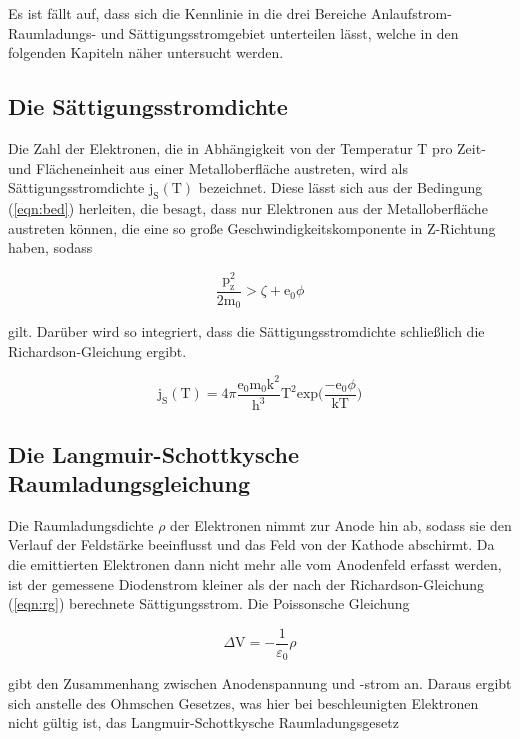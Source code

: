 \noindent
Es ist fällt auf, dass sich die Kennlinie in die drei Bereiche Anlaufstrom- Raumladungs- und Sättigungsstromgebiet unterteilen lässt,
welche in den folgenden Kapiteln näher untersucht werden.


\subsection{Die Sättigungsstromdichte}

\noindent
Die Zahl der Elektronen, die in Abhängigkeit von der Temperatur T pro Zeit- und Flächeneinheit aus einer Metalloberfläche austreten, 
wird als Sättigungsstromdichte $\text{j}_\text{S}(\text{T})$ bezeichnet.
Diese lässt sich aus der Bedingung (\ref{eqn:bed}) herleiten, die besagt, dass nur Elektronen aus der Metalloberfläche austreten können, 
die eine so große Geschwindigkeitskomponente in Z-Richtung haben, sodass

\begin{equation}
\frac{\text{p}_\text{z}^2}{2\text{m}_0} > \zeta + \text{e}_0 \phi
\label{eqn:bed}
\end{equation}

\noindent
gilt. Darüber wird so integriert, dass die Sättigungsstromdichte schließlich die Richardson-Gleichung ergibt.

\begin{equation}
\text{j}_\text{S}(\text{T}) = 4\pi \frac{\text{e}_0 \text{m}_0 \text{k}^2}{\text{h}^3} \text{T}^2 \text{exp} \biggl( \frac{-\text{e}_0 \phi}{\text{kT}} \biggr)
\label{eqn:rg}
\end{equation}

\subsection{Die Langmuir-Schottkysche Raumladungsgleichung}
Die Raumladungsdichte $\rho$ der Elektronen nimmt zur Anode hin ab, 
sodass sie den Verlauf der Feldstärke beeinflusst und das Feld von der Kathode abschirmt.
Da die emittierten Elektronen dann nicht mehr alle vom Anodenfeld erfasst werden,
ist der gemessene Diodenstrom kleiner als der nach der Richardson-Gleichung (\ref{eqn:rg}) berechnete Sättigungsstrom.
Die Poissonsche Gleichung

\begin{equation}
\Delta \text{V} = - \frac{1}{\varepsilon_0} \rho
\end{equation}

\noindent
gibt den Zusammenhang zwischen Anodenspannung und -strom an.
Daraus ergibt sich anstelle des Ohmschen Gesetzes, was hier bei beschleunigten Elektronen nicht gültig ist,
das Langmuir-Schottkysche Raumladungsgesetz

